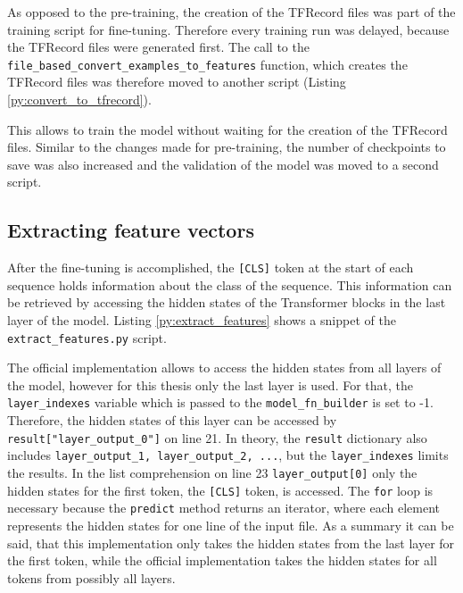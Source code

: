 As opposed to the pre-training, the creation of the TFRecord files was part of the training script for fine-tuning.
Therefore every training run was delayed, because the TFRecord files were generated first.
The call to the \texttt{file\_based\_convert\_examples\_to\_features} function, which creates the TFRecord files was therefore moved to another script (Listing \ref{py:convert_to_tfrecord}).

This allows to train the model without waiting for the creation of the TFRecord files.
Similar to the changes made for pre-training, the number of checkpoints to save was also increased and the validation of the model was moved to a second script.

\subsection{Extracting feature vectors}
\label{subsec:extracting_feature_vectors}
After the fine-tuning is accomplished, the \texttt{[CLS]} token at the start of each sequence holds information about the class of the sequence.
This information can be retrieved by accessing the hidden states of the Transformer blocks in the last layer of the model.
Listing \ref{py:extract_features} shows a snippet of the \texttt{extract\_features.py} script.

The official implementation allows to access the hidden states from all layers of the model, however for this thesis only the last layer is used.
For that, the \texttt{layer\_indexes} variable which is passed to the \texttt{model\_fn\_builder} is set to -1.
Therefore, the hidden states of this layer can be accessed by \texttt{result["layer\_output\_0"]} on line 21.
In theory, the \texttt{result} dictionary also includes \texttt{layer\_output\_1, layer\_output\_2, ...}, but the \texttt{layer\_indexes} limits the results.
In the list comprehension on line 23 \texttt{layer\_output[0]} only the hidden states for the first token, the \texttt{[CLS]} token, is accessed.
The \texttt{for} loop is necessary because the \texttt{predict} method returns an iterator, where each element represents the hidden states for one line of the input file.
As a summary it can be said, that this implementation only takes the hidden states from the last layer for the first token, while the official implementation takes the hidden states for all tokens from possibly all layers.

